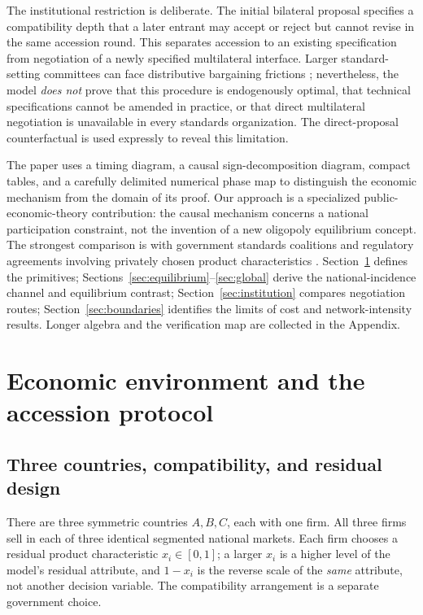 \documentclass[11pt,a4paper]{article}
\theoremstyle{remark}\newtheorem{remark}[theorem]{Remark}
\begin{document}
The institutional restriction is deliberate. The initial bilateral proposal specifies a compatibility depth that a later entrant may accept or reject but cannot revise in the same accession round. This separates accession to an existing specification from negotiation of a newly specified multilateral interface. Larger standard-setting committees can face distributive bargaining frictions \citep{Simcoe2012}; nevertheless, the model \emph{does not} prove that this procedure is endogenously optimal, that technical specifications cannot be amended in practice, or that direct multilateral negotiation is unavailable in every standards organization. The direct-proposal counterfactual is used expressly to reveal this limitation.

The paper uses a timing diagram, a causal sign-decomposition diagram, compact tables, and a carefully delimited numerical phase map to distinguish the economic mechanism from the domain of its proof. Our approach is a specialized public-economic-theory contribution: the causal mechanism concerns a national participation constraint, not the invention of a new oligopoly equilibrium concept. The strongest comparison is with government standards coalitions \citep{Takarada2020,Kawabata2021} and regulatory agreements involving privately chosen product characteristics \citep{Grossman2021}. Section~\ref{sec:model} defines the primitives; Sections~\ref{sec:equilibrium}--\ref{sec:global} derive the national-incidence channel and equilibrium contrast; Section~\ref{sec:institution} compares negotiation routes; Section~\ref{sec:boundaries} identifies the limits of cost and network-intensity results. Longer algebra and the verification map are collected in the Appendix.

\section{Economic environment and the accession protocol}\label{sec:model}
\subsection{Three countries, compatibility, and residual design}
There are three symmetric countries $A,B,C$, each with one firm. All three firms sell in each of three identical segmented national markets. Each firm chooses a residual product characteristic $x_i\in[0,1]$; a larger $x_i$ is a higher level of the model's residual attribute, and $1-x_i$ is the reverse scale of the \emph{same} attribute, not another decision variable. The compatibility arrangement is a separate government choice.
\end{document}
